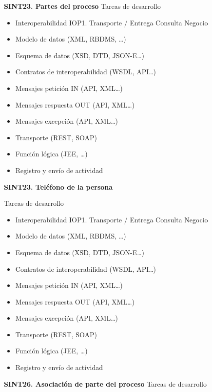 \documentclass[
  paper=a4,
  ,captions=tableheading
]{scrartcl}
\providecommand{\tightlist}{%
  \setlength{\itemsep}{0pt}\setlength{\parskip}{0pt}}
\begin{document}
\textbf{SINT23. Partes del proceso} Tareas de desarrollo

\begin{itemize}
\tightlist
\item
  Interoperabilidad IOP1. Transporte / Entrega Consulta Negocio
\item
  Modelo de datos (XML, RBDMS, \ldots)
\item
  Esquema de datos (XSD, DTD, JSON-E\ldots)
\item
  Contratos de interoperabilidad (WSDL, API\ldots)
\item
  Mensajes petición IN (API, XML\ldots)
\item
  Mensajes respuesta OUT (API, XML\ldots)
\item
  Mensajes excepción (API, XML\ldots)
\item
  Transporte (REST, SOAP)
\item
  Función lógica (JEE, \ldots)
\item
  Registro y envío de actividad
\end{itemize}

\textbf{SINT23. Teléfono de la persona}

Tareas de desarrollo

\begin{itemize}
\tightlist
\item
  Interoperabilidad IOP1. Transporte / Entrega Consulta Negocio
\item
  Modelo de datos (XML, RBDMS, \ldots)
\item
  Esquema de datos (XSD, DTD, JSON-E\ldots)
\item
  Contratos de interoperabilidad (WSDL, API\ldots)
\item
  Mensajes petición IN (API, XML\ldots)
\item
  Mensajes respuesta OUT (API, XML\ldots)
\item
  Mensajes excepción (API, XML\ldots)
\item
  Transporte (REST, SOAP)
\item
  Función lógica (JEE, \ldots)
\item
  Registro y envío de actividad
\end{itemize}

\textbf{SINT26. Asociación de parte del proceso} Tareas de desarrollo
\end{document}

